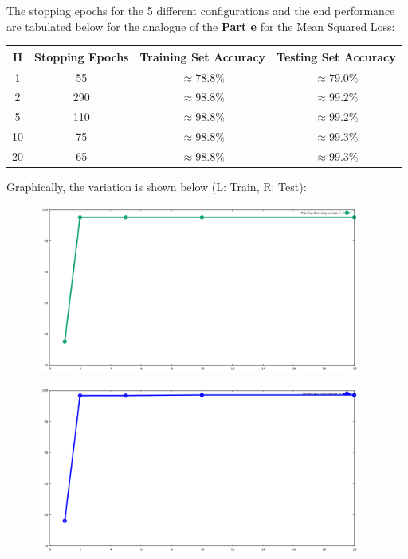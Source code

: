 \documentclass{article}
\begin{document}
\begin{flushleft}
The stopping epochs for the 5 different configurations and the end performance are tabulated below for the analogue of the \textbf{Part e} for the Mean Squared Loss:
\begin{center}
\begin{tabular}{|c|c|c|c|}
\hline
H & Stopping Epochs & Training Set Accuracy & Testing Set Accuracy \\
\hline
\hline
1 & 55 & \(\approx 78.8\%\) & \(\approx 79.0\%\)\\
\hline
2 & 290 & \(\approx 98.8\%\)& \(\approx 99.2\%\)\\
\hline
5 & 110 & \(\approx 98.8\%\)& \(\approx 99.2\%\)\\
\hline
10 & 75 & \(\approx 98.8\%\)& \(\approx 99.3\%\)\\
\hline
20 & 65 & \(\approx 98.8\%\)& \(\approx 99.3\%\)\\
\hline
\end{tabular}
\end{center}

Graphically, the variation is shown below (L: Train, R: Test):
\begin{minipage}{0.49\linewidth}
\begin{figure}[H]
\centering
\includegraphics[width=0.95\textwidth]{train_H_MSE.png}
\end{figure}
\end{minipage}
\hfill
\begin{minipage}{0.49\linewidth}
\begin{figure}[H]
\centering
\includegraphics[width=0.95\textwidth]{test_H_MSE.png}
\end{figure}
\end{minipage}
\end{flushleft}
\end{document}
